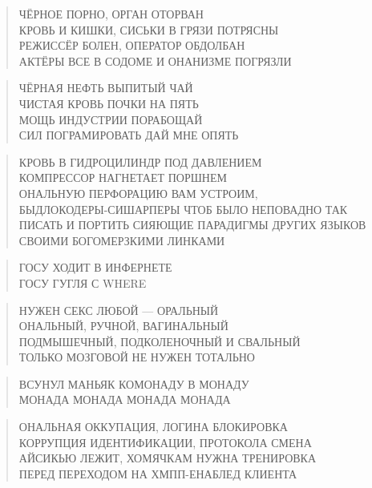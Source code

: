 \poemtitle{***}
\begin{verse}
ЧЁРНОЕ ПОРНО, ОРГАН ОТОРВАН\\
КРОВЬ И КИШКИ, СИСЬКИ В ГРЯЗИ ПОТРЯСНЫ\\
РЕЖИССЁР БОЛЕН, ОПЕРАТОР ОБДОЛБАН\\
АКТЁРЫ ВСЕ В СОДОМЕ И ОНАНИЗМЕ ПОГРЯЗЛИ
\end{verse}

\poemtitle{***}
\begin{verse}
ЧЁРНАЯ НЕФТЬ ВЫПИТЫЙ ЧАЙ\\
ЧИСТАЯ КРОВЬ ПОЧКИ НА ПЯТЬ\\
МОЩЬ ИНДУСТРИИ ПОРАБОЩАЙ\\
СИЛ ПОГРАМИРОВАТЬ ДАЙ МНЕ ОПЯТЬ
\end{verse}

\poemtitle{***}
\begin{verse}
КРОВЬ В ГИДРОЦИЛИНДР ПОД ДАВЛЕНИЕМ\\
КОМПРЕССОР НАГНЕТАЕТ ПОРШНЕМ\\
ОНАЛЬНУЮ ПЕРФОРАЦИЮ ВАМ УСТРОИМ,\\
БЫДЛОКОДЕРЫ-СИШАРПЕРЫ ЧТОБ БЫЛО НЕПОВАДНО ТАК ПИСАТЬ И ПОРТИТЬ СИЯЮЩИЕ ПАРАДИГМЫ ДРУГИХ ЯЗЫКОВ СВОИМИ БОГОМЕРЗКИМИ ЛИНКАМИ
\end{verse}

\poemtitle{***}
\begin{verse}
ГОСУ ХОДИТ В ИНФЕРНЕТЕ\\
ГОСУ ГУГЛЯ С WHERE
\end{verse}

\poemtitle{***}
\begin{verse}
НУЖЕН СЕКС ЛЮБОЙ — ОРАЛЬНЫЙ\\
ОНАЛЬНЫЙ, РУЧНОЙ, ВАГИНАЛЬНЫЙ\\
ПОДМЫШЕЧНЫЙ, ПОДКОЛЕНОЧНЫЙ И СВАЛЬНЫЙ\\
ТОЛЬКО МОЗГОВОЙ НЕ НУЖЕН ТОТАЛЬНО
\end{verse}

\poemtitle{***}
\begin{verse}
ВСУНУЛ МАНЬЯК КОМОНАДУ В МОНАДУ\\
МОНАДА МОНАДА МОНАДА МОНАДА
\end{verse}

\poemtitle{***}
\begin{verse}
ОНАЛЬНАЯ ОККУПАЦИЯ, ЛОГИНА БЛОКИРОВКА\\
КОРРУПЦИЯ ИДЕНТИФИКАЦИИ, ПРОТОКОЛА СМЕНА\\
АЙСИКЬЮ ЛЕЖИТ, ХОМЯЧКАМ НУЖНА ТРЕНИРОВКА\\
ПЕРЕД ПЕРЕХОДОМ НА ХМПП-ЕНАБЛЕД КЛИЕНТА
\end{verse}

